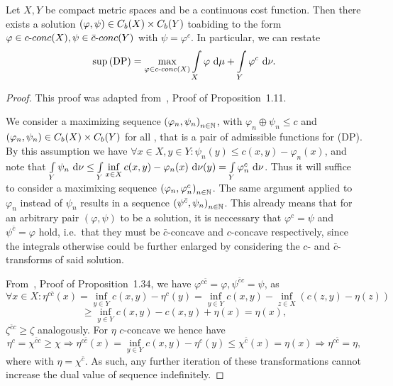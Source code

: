 \begin{theorem}\label{DPSolExist}
	Let $X, Y$ be compact metric spaces and  be a continuous cost function. Then there exists a solution $(\varphi,\psi) \in \CF[b]{X} \times \CF[b]{Y}$ toabiding to the form $\varphi \in \CConc{X}, \psi \in \CBConc{Y}$ with $\psi = \varphi^c$. In particular, we can restate
	\[ \sup\!\text{\normalfont\,(DP)} = \max\limits_{\varphi \in \CConc{X}} \int\limits_X \varphi~\D + \int\limits_Y \varphi^c~\D[\nu]. \]
\end{theorem}

\begin{proof}
	This proof was adapted from~\cite{San2015}, Proof of Proposition~1.11.

	We consider a maximizing sequence ${(\varphi_n, \psi_n)}_{\NinN}$, with $\varphi_n \oplus \psi_n \le c$ and $(\varphi_n, \psi_n) \in \CF[b]{X} \times \CF[b]{Y}$ for all \NinN{}, that is a pair of admissible functions for (DP). By this assumption we have $\forall x \in X, y \in Y: \psi_n(y) \le c(x, y) - \varphi_n(x)$, and note that $\int\limits_Y \psi_n~\D[\nu] \le \int\limits_Y \inf\limits_{x \in X} c(x, y) - \varphi_n(x)~\Dx[y]{\nu} = \int\limits_Y \varphi_n^c~\D[\nu]$. Thus it will suffice to consider a maximixing sequence ${(\varphi_n, \varphi_n^c)}_{\NinN}$. The same argument applied to $\varphi_n$ instead of $\psi_n$ results in a sequence ${(\psi^{\bar{c}}, \psi_n)}_{\NinN}$. This already means that for an arbitrary pair $(\varphi, \psi)$ to be a solution, it is neccessary that $\varphi^c = \psi$ and $\psi^{\bar{c}} = \varphi$ hold, i.e.~that they must be $\bar{c}$-concave and $c$-concave respectively, since the integrals otherwise could be further enlarged by considering the $c$- and $\bar{c}$-transforms of said solution.

	From~\cite{San2015}, Proof of Proposition~1.34, we have $\varphi^{c\bar{c}} = \varphi, \psi^{\bar{c}c} = \psi$, as
	\[ \forall x \in X: \eta^{c\bar{c}}(x) = \inf\limits_{y \in Y} c(x, y) - \eta^c(y) = \inf\limits_{y \in Y} c(x, y) - \inf\limits_{z \in X} (c(z, y) - \eta(z)) \]
	\[ \ge \inf\limits_{y \in Y} c(x, y) - c(x, y) + \eta(x) = \eta(x), \]
	$\zeta^{\bar{c}c} \ge \zeta$ analogously. For $\eta$ $c$-concave we hence have
	\[ \eta^c = \chi^{\bar{c}c} \ge \chi \Rightarrow \eta^{c\bar{c}}(x) = \inf\limits_{y \in Y} c(x, y) - \eta^c(y) \le \chi^{\bar{c}}(x) = \eta(x) \Rightarrow \eta^{c\bar{c}} = \eta, \]
	where  with $\eta = \chi^{\bar{c}}$. As such, any further iteration of these transformations cannot increase the dual value of sequence indefinitely.


\end{proof}
